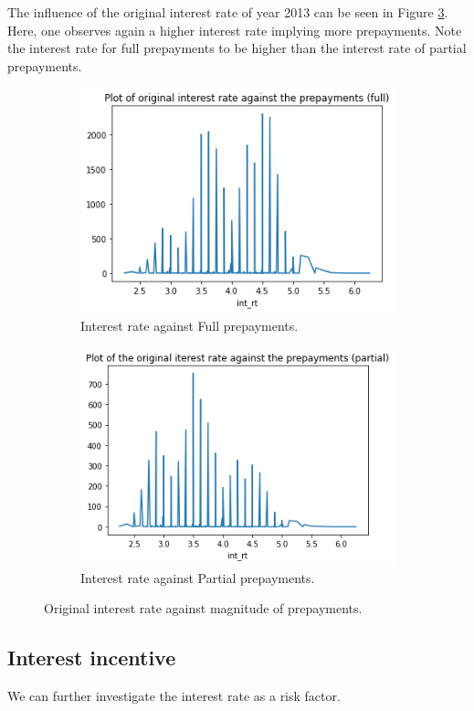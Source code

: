         \noindent
        The influence of the original interest rate of year 2013 can be seen in Figure \ref{model_int_rt_against_prepayment}. Here, one observes again a higher interest rate implying more prepayments. Note the interest rate for full prepayments to be higher than the interest rate of partial prepayments. 
        \begin{figure}[H]
            \centering
            \begin{subfigure}{0.45\textwidth}
                \includegraphics[width=\linewidth]{Latex/Report/Figures/int_rt againts Full prepayments.png}
                \caption{Interest rate against Full prepayments.}
                \label{model_int_rt_against_full_prepayment}
            \end{subfigure}
            \begin{subfigure}{0.45\textwidth}
                \includegraphics[width=\linewidth]{Latex/Report/Figures/int_rt againts Partial prepayments.png}
                \caption{Interest rate against Partial prepayments.}
                \label{model_int_rt_against_partial_prepayment}
            \end{subfigure}
            \caption{Original interest rate against magnitude of prepayments.}
            \label{model_int_rt_against_prepayment}
        \end{figure}
        
    
    

\subsection{Interest incentive}
We can further investigate the interest rate as a risk factor.



